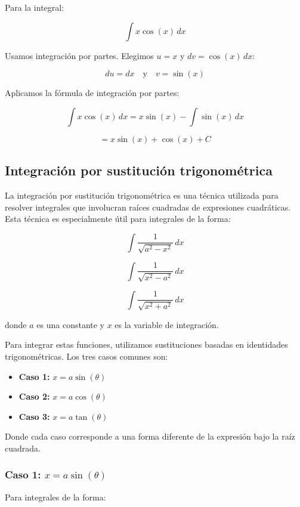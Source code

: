 \begin{example}
    Para la integral:

\[
\int x \cos(x) \, dx
\]

Usamos integración por partes. Elegimos \(u = x\) y \(dv = \cos(x) \, dx\):

\[
du = dx \quad \text{y} \quad v = \sin(x)
\]

Aplicamos la fórmula de integración por partes:

\[
\int x \cos(x) \, dx = x \sin(x) - \int \sin(x) \, dx
\]

\[
= x \sin(x) + \cos(x) + C
\]
\end{example}

\subsection{Integración por sustitución trigonométrica}

La integración por sustitución trigonométrica es una técnica utilizada para resolver integrales que involucran raíces cuadradas de expresiones cuadráticas. Esta técnica es especialmente útil para integrales de la forma:

\[
\int \frac{1}{\sqrt{a^2 - x^2}} \, dx
\]

\[
\int \frac{1}{\sqrt{x^2 - a^2}} \, dx
\]

\[
\int \frac{1}{\sqrt{x^2 + a^2}} \, dx
\]

donde \( a \) es una constante y \( x \) es la variable de integración.

Para integrar estas funciones, utilizamos sustituciones basadas en identidades trigonométricas. Los tres casos comunes son:

\begin{itemize}
  \item \textbf{Caso 1:} \( x = a \sin(\theta) \)
  \item \textbf{Caso 2:} \( x = a \cos(\theta) \)
  \item \textbf{Caso 3:} \( x = a \tan(\theta) \)
\end{itemize}

Donde cada caso corresponde a una forma diferente de la expresión bajo la raíz cuadrada.


\subsubsection{Caso 1: \( x = a \sin(\theta) \)}

Para integrales de la forma:

